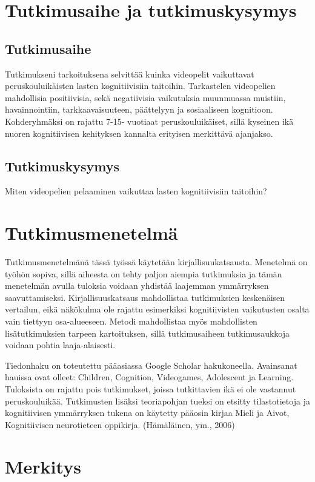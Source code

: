 \documentclass[utf8,bachelor]{gradu3}
\begin{document}
\chapter{Tutkimusaihe ja tutkimuskysymys}

\section{Tutkimusaihe}

Tutkimukseni tarkoituksena selvittää kuinka videopelit vaikuttavat peruskouluikäisten lasten kognitiivisiin taitoihin.  Tarkastelen videopelien mahdollisia positiivisia, sekä negatiivisia  vaikutuksia muunmuassa muistiin, havainnointiin, tarkkaavaisuuteen, päättelyyn ja sosiaaliseen kognitioon.  Kohderyhmäksi on rajattu 7-15- vuotiaat peruskouluikäiset, sillä kyseinen ikä nuoren kognitiivisen kehityksen kannalta erityisen merkittävä ajanjakso.

\section{Tutkimuskysymys}

Miten videopelien pelaaminen vaikuttaa lasten kognitiivisiin taitoihin? 

\chapter{Tutkimusmenetelmä}
Tutkimusmenetelmänä tässä työssä käytetään kirjallisuukatsausta. Menetelmä on työhön sopiva, sillä aiheesta on tehty paljon aiempia tutkimuksia ja tämän menetelmän avulla tuloksia voidaan yhdistää laajemman ymmärryksen saavuttamiseksi. Kirjallisuuskatsaus mahdollistaa tutkimuksien keskenäisen vertailun, eikä näkökulma ole rajattu esimerkiksi kognitiivisten vaikutusten osalta vain tiettyyn osa-alueeseen. Metodi mahdollistaa myös mahdollisten lisätutkimuksien tarpeen kartoituksen, sillä tutkimusaiheen tutkimusaukkoja voidaan pohtia laaja-alaisesti.  

Tiedonhaku on toteutettu pääasiassa Google Scholar hakukoneella. Avainsanat hauissa ovat olleet: Children, Cognition, Videogames, Adolescent ja Learning. Tuloksista on rajattu pois tutkimukset, joissa tutkittavien ikä ei ole vastannut peruskouluikää. Tutkimusten lisäksi teoriapohjan tueksi on etsitty tilastotietoja ja kognitiivisen ymmärryksen tukena on käytetty pääosin kirjaa Mieli ja Aivot, Kognitiivisen neurotieteen oppikirja. (Hämäläinen, ym., 2006) 

\chapter{Merkitys}
\end{document}
